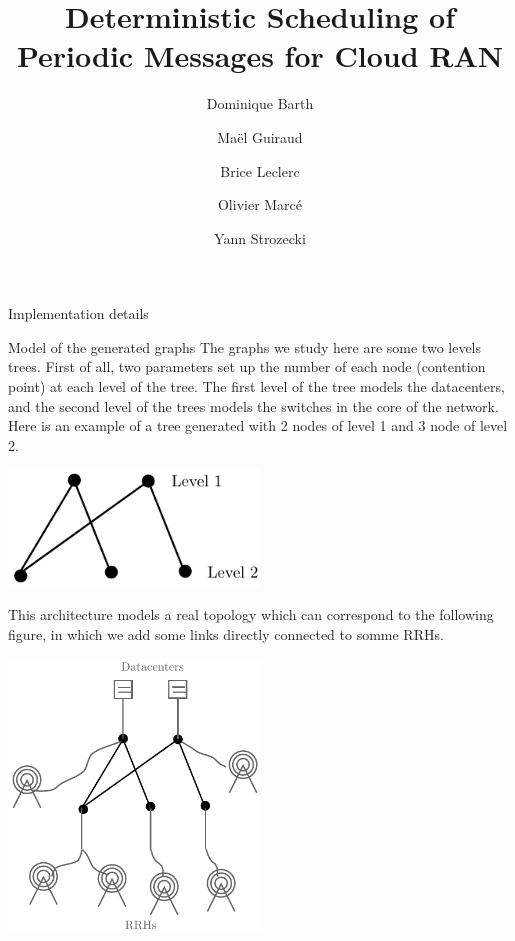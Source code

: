 \documentclass[10pt]{article}
\title{Deterministic Scheduling of Periodic Messages for Cloud RAN}
\author[1]{Dominique Barth}
\author[1,2]{Ma\"el Guiraud}
\author[2]{Brice Leclerc}
\author[2]{Olivier Marc\'e}
\author[1]{Yann Strozecki}
\affil[1]{David Laboratory, UVSQ}
\affil[2]{Nokia Bell Labs France}
\begin{document}
\begin{section}{Implementation details}
\begin{subsection}{Model of the generated graphs}
The graphs we study here are some two levels trees. First of all, two parameters set up the number of each node (contention point) at each level of the tree. The first level of the tree models the datacenters, and the second level of the trees models the switches in the core of the network.
Here is an example of a tree generated with 2  nodes of level 1 and 3  node of level 2.

\begin{center}
\includegraphics[width=0.5\textwidth]{random23}
\end{center}

This architecture models a real topology which can correspond to the following figure, in which we add some links directly connected to somme RRHs.

\begin{center}

\includegraphics[width=0.5\textwidth]{example23}
\end{center}
  

\end{subsection}
\end{section}
\end{document}
